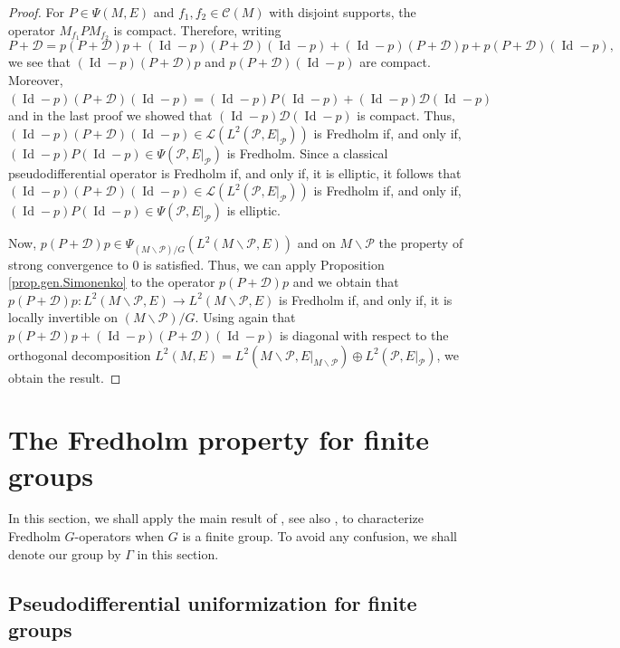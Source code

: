 \documentclass[11pt,a4paper]{amsart}
\newcommand{\maC}{\mathcal C}
\newcommand{\maD}{\mathcal D}
\newcommand{\maL}{\mathcal L}
\newcommand{\maP}{\mathcal P}
\newcommand\<{\langle}
\renewcommand\>{\rangle}
\newcommand{\oid}{\operatorname{Id}}
\theoremstyle{definition}
\begin{document}
\begin{proof}
For  $P \in \Psi(M,E)$ and $f_1,f_2 \in \maC(M)$ with disjoint supports, the operator $M_{f_1} P M_{f_2}$ is compact. 
Therefore, writing
\begin{equation*}
P + \maD = p(P + \maD)p + (\oid-p)(P + \maD)(\oid-p)+ (\oid-p)(P + \maD)p + p(P + \maD)(\oid-p),
\end{equation*}
we see that $(\oid-p)(P + \maD)p$ and $p(P + \maD)(\oid-p)$ are compact.
Moreover, $(\oid-p)(P + \maD)(\oid-p)=(\oid-p)P(\oid-p) + (\oid-p)\maD(\oid-p)$ and
in the last proof we showed that $(\oid-p)\maD(\oid-p)$ is compact.
Thus, $(\oid-p)(P + \maD)(\oid-p) \in \maL(L^2(\maP,E\vert_\maP))$ is Fredholm if, and only if, 
$(\oid-p)P (\oid-p) \in \Psi(\maP,E\vert_\maP)$ is Fredholm.
Since a classical pseudodifferential operator is Fredholm if, and only if, it is elliptic, 
it follows that $(\oid-p)(P + \maD)(\oid-p) \in \maL(L^2(\maP,E\vert_\maP))$ is Fredholm if, and only if, 
$(\oid-p)P (\oid-p) \in \Psi(\maP,E\vert_\maP)$ is elliptic.

Now, $p(P + \maD)p \in \Psi_{(M\smallsetminus \maP)/G}(L^2(M\smallsetminus \maP,E))$ and 
on $M\smallsetminus \maP$ the property of strong convergence to $0$ is satisfied. 
Thus, we can apply Proposition \ref{prop.gen.Simonenko} 
to the operator $p(P + \maD)p$ and we obtain that 
$p(P + \maD)p : L^2(M\smallsetminus \maP ,E) \rightarrow L^2(M\smallsetminus \maP ,E)$ 
is Fredholm if, and only if, it is locally invertible on $(M \smallsetminus \maP) /G$.
Using again that $p(P + \maD)p + (\oid - p) (P + \maD)(\oid-p)$ 
is diagonal with respect to the orthogonal decomposition 
$L^2(M,E) =L^2(M\smallsetminus \maP , E\vert_{M\smallsetminus \maP}) \oplus L^2(\maP,E\vert_\maP)$,
we obtain  the result.
\end{proof}




\section{The Fredholm property for finite groups}\label{sec.finite}
In this section, we shall apply the main result of \cite{BCLN2}, see also \cite{BCLN1,BCN}, 
to characterize Fredholm $G$-operators when $G$ is a finite group.
To avoid any confusion, we shall denote our group by $\Gamma$ in this section.

\subsection*{Pseudodifferential uniformization for finite groups}
\end{document}
